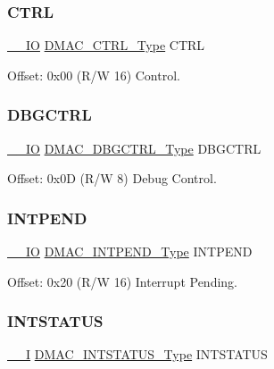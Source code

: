 \subsubsection{\texorpdfstring{CTRL}{CTRL}}
{\footnotesize\ttfamily \mbox{\hyperlink{core__cm0plus_8h_aec43007d9998a0a0e01faede4133d6be}{\+\_\+\+\_\+\+IO}} \mbox{\hyperlink{union_d_m_a_c___c_t_r_l___type}{D\+M\+A\+C\+\_\+\+C\+T\+R\+L\+\_\+\+Type}} C\+T\+RL}



Offset\+: 0x00 (R/W 16) Control. 

\mbox{\label{struct_dmac_af28d69d1472a67b2881b73eec8dd366f}} 
\subsubsection{\texorpdfstring{DBGCTRL}{DBGCTRL}}
{\footnotesize\ttfamily \mbox{\hyperlink{core__cm0plus_8h_aec43007d9998a0a0e01faede4133d6be}{\+\_\+\+\_\+\+IO}} \mbox{\hyperlink{union_d_m_a_c___d_b_g_c_t_r_l___type}{D\+M\+A\+C\+\_\+\+D\+B\+G\+C\+T\+R\+L\+\_\+\+Type}} D\+B\+G\+C\+T\+RL}



Offset\+: 0x0D (R/W 8) Debug Control. 

\mbox{\label{struct_dmac_a3d322167585abb8aa35805bb00e9bf54}} 
\subsubsection{\texorpdfstring{INTPEND}{INTPEND}}
{\footnotesize\ttfamily \mbox{\hyperlink{core__cm0plus_8h_aec43007d9998a0a0e01faede4133d6be}{\+\_\+\+\_\+\+IO}} \mbox{\hyperlink{union_d_m_a_c___i_n_t_p_e_n_d___type}{D\+M\+A\+C\+\_\+\+I\+N\+T\+P\+E\+N\+D\+\_\+\+Type}} I\+N\+T\+P\+E\+ND}



Offset\+: 0x20 (R/W 16) Interrupt Pending. 

\mbox{\label{struct_dmac_a554dd4501cfc63278a4a2838ab2bfcfc}} 
\subsubsection{\texorpdfstring{INTSTATUS}{INTSTATUS}}
{\footnotesize\ttfamily \mbox{\hyperlink{core__cm0plus_8h_af63697ed9952cc71e1225efe205f6cd3}{\+\_\+\+\_\+I}} \mbox{\hyperlink{union_d_m_a_c___i_n_t_s_t_a_t_u_s___type}{D\+M\+A\+C\+\_\+\+I\+N\+T\+S\+T\+A\+T\+U\+S\+\_\+\+Type}} I\+N\+T\+S\+T\+A\+T\+US}



